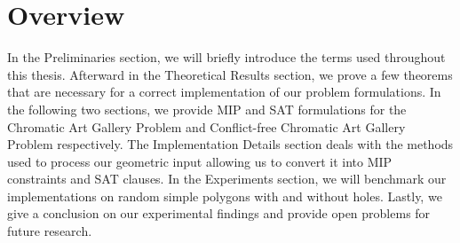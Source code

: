 \section{Overview}
In the Preliminaries section, we will briefly introduce the terms used throughout this thesis. Afterward in the Theoretical Results section, we prove a few theorems that are necessary for a correct implementation of our problem formulations. In the following two sections, we provide MIP and SAT formulations for the Chromatic Art Gallery Problem and Conflict-free Chromatic Art Gallery Problem respectively. The Implementation Details section deals with the methods used to process our geometric input allowing us to convert it into MIP constraints and SAT clauses. In the Experiments section, we will benchmark our implementations on random simple polygons with and without holes. Lastly, we give a conclusion on our experimental findings and provide open problems for future research.